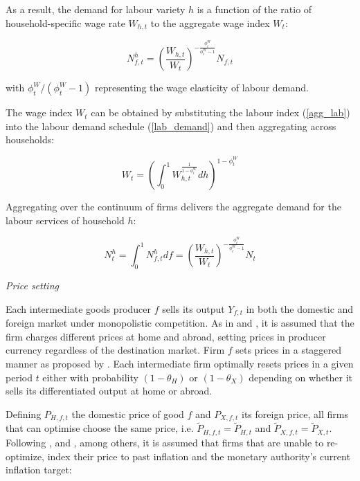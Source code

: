 \documentclass[a4paper,11pt]{article}
\numberwithin{equation}{section}
\begin{document}
	As a result, the demand for labour variety $h$ is a function of the ratio of household-specific wage rate $W_{h,t}$ to the aggregate wage index $W_t$:
	
	\begin{equation} \label{lab_demand}
	N^h_{f,t}=\left(\frac{W_{h,t}}{W_t}\right)^{-\frac{\phi^W_t}{\phi^W_t-1}}N_{f,t}
	\end{equation}
	
	with $\phi^W_t/(\phi^W_t-1)$ representing the wage elasticity of labour demand.
	
	The wage index $W_t$ can be obtained by substituting the labour index (\ref{agg_lab}) into the labour demand schedule (\ref{lab_demand}) and then aggregating across households:
	
	\begin{equation}
	W_t=\left(\int_{0}^{1}W_{h,t}^{\frac{1}{1-\phi^W_t}}dh\right)^{1-\phi^W_t}
	\end{equation}
	
	Aggregating over the continuum of firms delivers the aggregate demand for the labour services of household $h$:
	
	\begin{equation} \label{agg_n_demand}
	N^h_t=\int_{0}^{1}N^h_{f,t}df=\left(\frac{W_{h,t}}{W_t}\right)^{-\frac{\phi^W_t}{\phi^W_t-1}}N_t
	\end{equation}
	
	\vspace{8pt}
	\textit{Price setting}
	\vspace{8pt}
	
	Each intermediate goods producer $f$ sells its output $Y_{f,t}$ in both the domestic and foreign market under monopolistic competition. As in \cite{christoffel2008} and \cite{coenen2013}, it is assumed that the firm charges different prices at home and abroad, setting prices in producer currency regardless of the destination market. Firm $f$ sets prices in a staggered manner as proposed by \cite{calvo1983}. Each intermediate firm optimally resets prices in a given period $t$ either with probability $(1-\theta_H)$ or $(1-\theta_X)$ depending on whether it sells its differentiated output at home or abroad. 
	
	Defining $P_{H,f,t}$ the domestic price of good $f$ and $P_{X,f,t}$ its foreign price, all firms that can optimise choose the same price, i.e. $\tilde{P}_{H,f,t}=\tilde{P}_{H,t}$ and $\tilde{P}_{X,f,t}=\tilde{P}_{X,t}$. Following \cite{adolfson2007}, \cite{christoffel2008} and , among others, it is assumed that firms that are unable to re-optimize, index their price to past inflation and the monetary authority's current inflation target:
	
\end{document}
